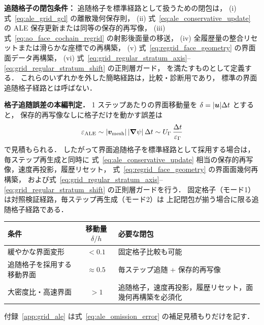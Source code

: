 \textbf{追随格子の閉包条件：}
追随格子を標準経路として扱うための閉包は，
(i) 式~\eqref{eq:ale_grid_gcl} の離散幾何保存則，
(ii) 式~\eqref{eq:ale_conservative_update} の ALE 保存更新または同等の保存的再写像，
(iii) 式~\eqref{eq:ao_face_cochain_regrid} の射影後面量の移送，
(iv) 全履歴量の整合リセットまたは滑らかな座標での再構築，
(v) 式~\eqref{eq:regrid_face_geometry} の界面面データ再構築，
(vi) 式~\eqref{eq:grid_regular_stratum_axis}--\eqref{eq:grid_regular_stratum_shift}
の正則層ガード，
を満たすものとして定義する．
これらのいずれかを外した簡略経路は，比較・診断用であり，
標準の界面追随格子経路とは呼ばない．

\noindent\textbf{格子追随誤差の本編判定．}
1 ステップあたりの界面移動量を $\delta=|\bm{u}|\Delta t$ とすると，
保存的再写像なしに格子だけを動かす誤差は
\[
  \varepsilon_{\mathrm{ALE}}
  \sim
  |\bm{v}_{\mathrm{mesh}}|\,|\bm{\nabla}\psi|\,\Delta t
  \sim
  U_\Gamma\,\frac{\Delta t}{\varepsilon_\Gamma}
  \label{eq:ale_omission_error}
\]
で見積もられる．
したがって界面追随格子を標準経路として採用する場合は，毎ステップ再生成と同時に
式~\eqref{eq:ale_conservative_update} 相当の保存的再写像，速度再投影，履歴リセット，
式~\eqref{eq:regrid_face_geometry} の界面面幾何再構築，
および式~\eqref{eq:grid_regular_stratum_axis}--\eqref{eq:grid_regular_stratum_shift}
の正則層ガードを行う．
固定格子（モード1）は対照検証経路，毎ステップ再生成（モード2）は
上記閉包が揃う場合に限る追随格子経路である．

\begin{center}
\PaperTableSetup
\begin{tabular}{>{\raggedright\arraybackslash}p{50mm}c>{\raggedright\arraybackslash}p{44mm}}
\hline
条件 & 移動量 $\delta/h$ & 必要な閉包 \\
\hline
緩やかな界面変形 & $<0.1$ & 固定格子比較も可能 \\
追随格子を採用する移動界面 & $\approx0.5$ & 毎ステップ追随 + 保存的再写像 \\
大密度比・高速界面 & $>1$ & 追随格子，速度再投影，履歴リセット，面幾何再構築を必須化 \\
\hline
\end{tabular}
\end{center}

付録~\ref{app:grid_ale} は式~\eqref{eq:ale_omission_error} の補足見積もりだけを記す．

